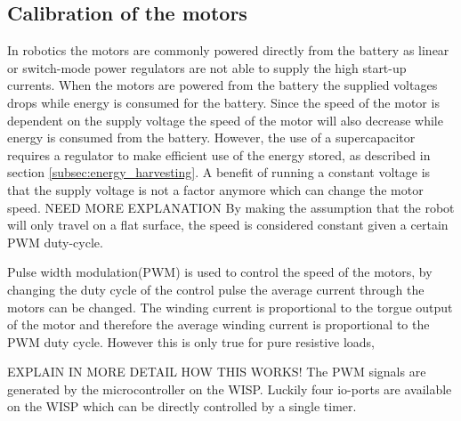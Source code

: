 


\subsection{Calibration of the motors}
\label{subsub:motor_calib}

In robotics the motors are commonly powered directly from the battery as linear or switch-mode power regulators are not able to supply the high start-up currents.
When the motors are powered from the battery the supplied voltages drops while energy is consumed for the battery.
Since the speed of the motor is dependent on the supply voltage the speed of the motor will also decrease while energy is consumed from the battery.
However, the use of a supercapacitor requires a regulator to make efficient use of the energy stored, as described in section \ref{subsec:energy_harvesting}.
A benefit of running a constant voltage is that the supply voltage is not a factor anymore which can change the motor speed.
NEED MORE EXPLANATION
By making the assumption that the robot will only travel on a flat surface, the speed is considered constant given a certain PWM duty-cycle.


Pulse width modulation(PWM) is used to control the speed of the motors, by changing the duty cycle of the control pulse the average current through the motors can be changed.
The winding current is proportional to the torgue output of the motor and therefore the average winding current is proportional to the PWM duty cycle.
However this is only true for pure resistive loads,


EXPLAIN IN MORE DETAIL HOW THIS WORKS!
The PWM signals are generated by the microcontroller on the WISP.
Luckily four io-ports are available on the WISP which can be directly controlled by a single timer.

